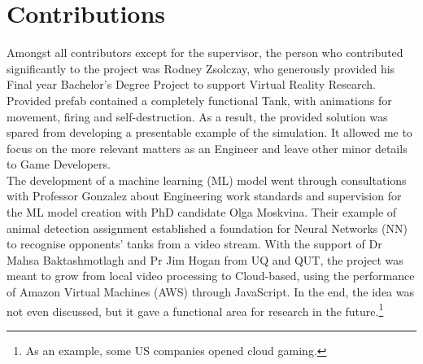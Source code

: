 \section{Contributions}
Amongst all contributors except for the supervisor, the person who contributed significantly to the project was Rodney Zsolczay, who generously provided his Final year Bachelor's Degree Project to support Virtual Reality Research.
Provided prefab contained a completely functional Tank, with animations for movement, firing and self-destruction. 
As a result, the provided solution was spared from developing a presentable example of the simulation.
It allowed me to focus on the more relevant matters as an Engineer and leave other minor details to Game Developers. \\
The development of a machine learning (ML) model went through consultations with Professor Gonzalez about Engineering work standards and supervision for the ML model creation with PhD candidate Olga Moskvina.
Their example of animal detection assignment established a foundation for Neural Networks (NN) to recognise opponents' tanks from a video stream.
With the support of  Dr Mahsa Baktashmotlagh and Pr Jim Hogan from UQ and QUT, the project was meant to grow from local video processing to Cloud-based, using the performance of Amazon Virtual Machines (AWS) through JavaScript.
In the end, the idea was not even discussed, but it gave a functional area for research in the future.\footnote{As an example, some US companies opened cloud gaming.}